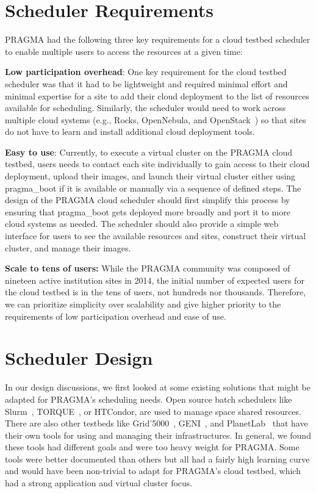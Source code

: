 \documentclass{acm_proc_article-sp}
\begin{document}
\section{Scheduler Requirements}

PRAGMA had the following three key requirements for a cloud testbed scheduler to enable multiple users to access the resources at a  given time:

\textbf{Low participation overhead}:  One key requirement for the cloud testbed scheduler was that it had to be lightweight and required  minimal effort and minimal expertise for a site to add their cloud deployment to the list of resources available for scheduling.   Similarly, the scheduler would need to work across multiple cloud systems (e.g., Rocks, OpenNebula, and OpenStack~\cite{openstack}) so that sites do not have to learn and install additional cloud deployment tools. 

\textbf{Easy to use}:  Currently, to execute a virtual cluster on the PRAGMA cloud testbed, users needs to contact each site individually to gain access to their cloud deployment, upload their images, and launch their virtual cluster either using pragma\_boot  if it is available or manually via a sequence of defined steps.   The design of the PRAGMA cloud scheduler should first simplify this process by ensuring that pragma\_boot gets deployed more broadly and port it to more cloud systems as needed.   The scheduler should also provide a simple web interface for users to see the available resources and sites, construct their virtual cluster, and manage their images.

\textbf{Scale to tens of users:}  While the PRAGMA community was composed of nineteen active institution sites in 2014, the initial number of expected users for the cloud testbed is in the tens of users, not hundreds nor thousands.  Therefore, we can prioritize simplicity over scalability and give higher priority to the requirements of low participation overhead and ease of use.

\section{Scheduler Design}
\label{Sec:Design}

In our design discussions, we first looked at some existing solutions that might be adapted for PRAGMA's scheduling needs.  Open source batch schedulers like Slurm~\cite{slurm}, TORQUE~\cite{torque}, or HTCondor, are used to manage space shared resources.  There are also other testbeds like Grid'5000~\cite{grid5000},  GENI~\cite{geni}, and PlanetLab~\cite{planetlab} that have their own tools for using and managing their infrastructures. In general, we found these tools had different goals and were too heavy weight for PRAGMA.  Some tools were better documented than others but all had a fairly high learning curve and would have been non-trivial to adapt for PRAGMA's cloud testbed, which had a strong application and virtual cluster focus.
\end{document}
